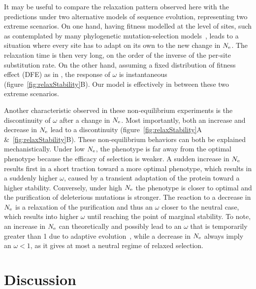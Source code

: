 \documentclass{article}
\begin{document}
It may be useful to compare the relaxation pattern observed here with the predictions under two alternative models of sequence evolution, representing two extreme scenarios.
On one hand, having fitness modelled at the level of sites, such as contemplated by many phylogenetic mutation-selection models~\citep{Halpern1998, Rodrigue2010, Tamuri2012}, leads to a situation where every site has to adapt on its own to the new change in $N_{\text{e}}$.
The relaxation time is then very long, on the order of the inverse of the per-site {substitution} rate.
On the other hand, assuming a fixed distribution of fitness effect ({DFE}) as in \citet{Welch2008}, the response of $\omega$ is instantaneous (figure~\ref{fig:relaxStability}B).
Our model is effectively in between these two extreme scenarios.

Another characteristic observed in these non-equilibrium experiments is the discontinuity of $\omega$ after a change in $N_{\text{e}}$.
Most importantly, both an increase and decrease in $N_{\text{e}}$ lead to a discontinuity (figure~\ref{fig:relaxStability}A \&~\ref{fig:relaxStability}B).
These non-equilibrium behaviors can both be explained mechanistically.
Under low $N_{\text{e}}$, the {phenotype} is far away from the optimal {phenotype} because the efficacy of selection is weaker.
A sudden increase in $N_{\text{e}}$ results first in a short traction toward a more optimal {phenotype}, which results in a suddenly higher $\omega$, caused by a transient adaptation of the protein toward a higher stability.
Conversely, under high $N_{\text{e}}$ the {phenotype} is closer to optimal and the purification of deleterious mutations is stronger.
The reaction to a decrease in $N_{\text{e}}$ is a relaxation of the purification and thus an $\omega$ closer to the {neutral} case, which results into higher $\omega$ until reaching the point of marginal stability.
To note, an increase in $N_{\text{e}}$ can theoretically and possibly lead to an $\omega$ that is temporarily greater than 1 due to adaptive evolution~\citep{Jones2016}, while a decrease in $N_{\text{e}}$ always imply an $\omega < 1$, as it gives at most a {neutral} regime of relaxed selection.


\section{Discussion}
\end{document}
